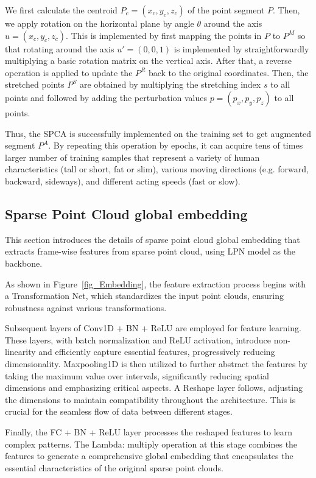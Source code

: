 We first calculate the centroid $P_c=(x_c,y_c,z_c)$ of the point segment $P$. 
Then, we apply rotation on the horizontal plane by angle $\theta$ around the axis $u=(x_c,y_c,z_c)$. 
This is implemented by first mapping the points in $P$ to $P^M$ so that rotating around the axis $u'=(0,0,1)$ is implemented by straightforwardly multiplying a basic rotation matrix on the vertical axis. 
After that, a reverse operation is applied to update the $P^R$ back to the original coordinates. 
Then, the stretched points $P^S$ are obtained by multiplying the stretching index $s$ to all points and followed by adding the perturbation values $p=(p_x,p_y,p_z)$  to all points. 

Thus, the SPCA is successfully implemented on the training set to get augmented segment $P^A$. 
By repeating this operation by epochs, it can acquire tens of times larger number of training samples that represent a variety of human characteristics (tall or short, fat or slim), various moving directions (e.g. forward, backward, sideways), and different acting speeds (fast or slow).


\subsection{Sparse Point Cloud global embedding}
\label{sec:SPCGE}
This section introduces the details of sparse point cloud global embedding that extracts frame-wise features from sparse point cloud, using LPN model as the backbone. 

As shown in Figure~\ref{fig_Embedding}, the feature extraction process begins with a Transformation Net, which standardizes the input point clouds, ensuring robustness against various transformations.

Subsequent layers of Conv1D + BN + ReLU are employed for feature learning. These layers, with batch normalization and ReLU activation, introduce non-linearity and efficiently capture essential features, progressively reducing dimensionality.
Maxpooling1D is then utilized to further abstract the features by taking the maximum value over intervals, significantly reducing spatial dimensions and emphasizing critical aspects. 
A Reshape layer follows, adjusting the dimensions to maintain compatibility throughout the architecture. This is crucial for the seamless flow of data between different stages.

Finally, the FC + BN + ReLU layer processes the reshaped features to learn complex patterns. The Lambda: multiply operation at this stage combines the features to generate a comprehensive global embedding that encapsulates the essential characteristics of the original sparse point clouds.

